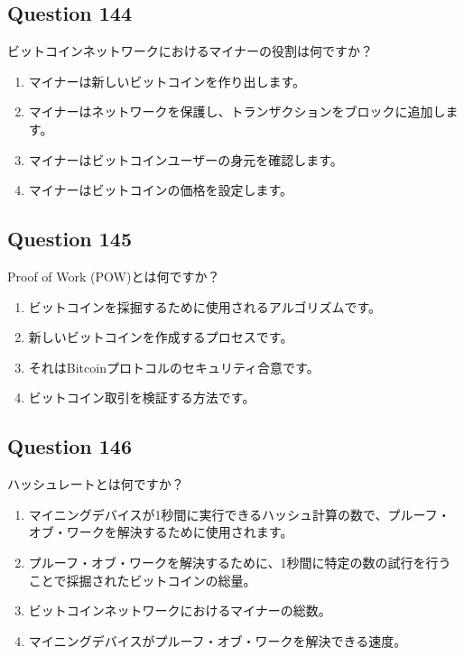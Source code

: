 \documentclass[12pt,a4paper]{article}
\begin{document}
\bigskip


\subsection*{Question 144}
ビットコインネットワークにおけるマイナーの役割は何ですか？

\begin{enumerate}[label=\Alph*., leftmargin=*]
\item マイナーは新しいビットコインを作り出します。
\item マイナーはネットワークを保護し、トランザクションをブロックに追加します。
\item マイナーはビットコインユーザーの身元を確認します。
\item マイナーはビットコインの価格を設定します。
\end{enumerate}

\bigskip


\subsection*{Question 145}
Proof of Work (POW)とは何ですか？

\begin{enumerate}[label=\Alph*., leftmargin=*]
\item ビットコインを採掘するために使用されるアルゴリズムです。
\item 新しいビットコインを作成するプロセスです。
\item それはBitcoinプロトコルのセキュリティ合意です。
\item ビットコイン取引を検証する方法です。
\end{enumerate}

\bigskip


\subsection*{Question 146}
ハッシュレートとは何ですか？

\begin{enumerate}[label=\Alph*., leftmargin=*]
\item マイニングデバイスが1秒間に実行できるハッシュ計算の数で、プルーフ・オブ・ワークを解決するために使用されます。
\item プルーフ・オブ・ワークを解決するために、1秒間に特定の数の試行を行うことで採掘されたビットコインの総量。
\item ビットコインネットワークにおけるマイナーの総数。
\item マイニングデバイスがプルーフ・オブ・ワークを解決できる速度。
\end{enumerate}
\end{document}
